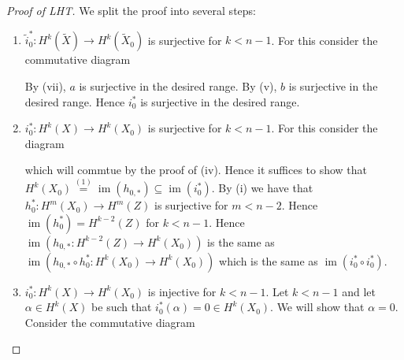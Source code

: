 \documentclass[A4paper, british, reqno]{amsart}
\theoremstyle{darkgreentheorem}
\theoremstyle{darkbluedefinition}
\theoremstyle{darkredexample}
\theoremstyle{remark}
\DeclareMathOperator{\im}{im}
\newcommand{\1}{\mathbbm{1}}
\newcommand{\op}{\oplus}
\newcommand{\sub}{\subseteq}
\begin{document}
\begin{proof}[Proof of LHT]
    We split the proof into several steps:
    \begin{enumerate}
	\item $\tilde{i}_{0}^{*}\colon H^{k}(\tilde{X})\to H^{k}(\tilde{X}_{0})$ is surjective for $k<n-1$.
	    For this consider the commutative diagram
	    \begin{center}
	    \end{center}
	    By (vii), $a$ is surjective in the desired range.
	    By (v), $b$ is surjective in the desired range.
	    Hence $i_{0}^{*}$ is surjective in the desired range.
	\item $i_{0}^{*}\colon H^{k}(X)\to H^{k}(X_{0})$ is surjective for $k<n-1$.
	    For this consider the diagram
	    \begin{center}
	    \end{center}
	    which will commtue by the proof of (iv).
	    Hence it suffices to show that $H^{k}(X_{0})\overset{(1)}{=}\im(h_{0,*})\sub \im(i_{0}^{*})$.
	    By (i) we have that $h_{0}^{*}\colon H^{m}(X_{0})\to H^{m}(Z)$ is surjective for $m<n-2$.
	    Hence $\im(h_{0}^{*})=H^{k-2}(Z)$ for $k<n-1$.
	    Hence $\im(h_{0,*}\colon H^{k-2}(Z)\to H^{k}(X_{0}))$ is the same as $\im(h_{0,*}\circ h_{0}^{*}\colon H^{k}(X_{0})\to H^{k}(X_{0}))$ which is the same as $\im(i_{0}^{*}\circ i_{0}^{*})$.
	\item $i_{0}^{*}\colon H^{k}(X)\to H^{k}(X_{0})$ is injective for $k<n-1$.
	    Let $k<n-1$ and let $\alpha\in H^{k}(X)$ be such that $i_{0}^{*}(\alpha)=0\in H^{k}(X_{0})$.
	    We will show that $\alpha=0$.
	    Consider the commutative diagram
	    \begin{center}
\end{center}
\end{enumerate}
\end{proof}
\end{document}
